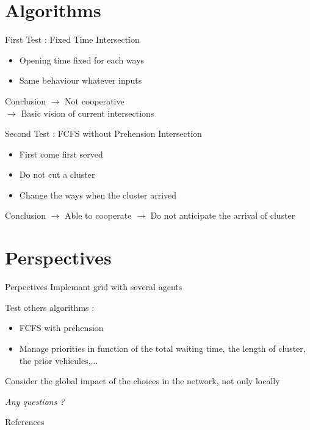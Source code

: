 \documentclass[]{beamer}
\begin{document}
\section{Algorithms}
\begin{frame}{First Test : Fixed Time Intersection}
 \begin{itemize}
  \item Opening time fixed for each ways
  \item Same behaviour whatever inputs
 \end{itemize}
 \begin{block}{Conclusion}
  $\rightarrow$ Not cooperative\\
  $\rightarrow$ Basic vision of current intersections
 \end{block}
\end{frame}

\begin{frame}{Second Test : FCFS without Prehension Intersection}
 \begin{itemize}
  \item First come first served
  \item Do not cut a cluster
  \item Change the ways when the cluster arrived
 \end{itemize}
 \begin{block}{Conclusion}
  $\rightarrow$ Able to cooperate
  $\rightarrow$ Do not anticipate the arrival of cluster
 \end{block}
\end{frame}

\section{Perspectives}
\begin{frame}{Perpectives}
Implemant grid with several agents\vspace{0.5cm}

Test others algorithms :
 \begin{itemize}
  \item FCFS with prehension
  \item Manage priorities in function of the total waiting time, the length of cluster, the prior vehicules,...
 \end{itemize}
 \vspace{0.5cm}
Consider the global impact of the choices in the network, not only locally
\end{frame}

\begin{frame}
\centering \LARGE
  \emph{Any questions ?}
\end{frame}

\begin{frame}{References}
\end{frame}
\end{document}
